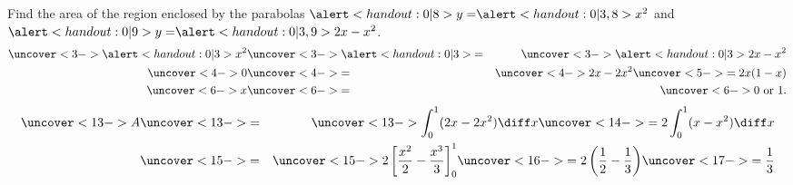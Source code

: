 \begin{frame}
\begin{example}[Example 2, p. 348]
\begin{columns}
Find the area of the region enclosed by the parabolas $\alert<handout:0| 8>{y =} \alert<handout:0| 3,8>{x^2}$ and $\alert<handout:0| 9>{y =} \alert<handout:0| 3,9>{2x - x^2}$.
\begin{eqnarray*}
\uncover<3->{\alert<handout:0| 3>{x^2}} & \uncover<3->{\alert<handout:0| 3>{=}} & \uncover<3->{\alert<handout:0| 3>{2x - x^2}} \\
\uncover<4->{0} & \uncover<4->{=} & \uncover<4->{2x - 2x^2} \uncover<5->{ = 2x(1 - x)} \\
\uncover<6->{x} & \uncover<6->{=} & \uncover<6->{0 \textrm{ or } 1.}
\end{eqnarray*}
\begin{eqnarray*}
\uncover<13->{A} & \uncover<13->{=} & \uncover<13->{\int_0^1 (2x - 2x^2) \diff x} \uncover<14->{ = 2\int_0^1 (x - x^2) \diff x} \\
 & \uncover<15->{=} & \uncover<15->{2\left[ \frac{x^2}{2} - \frac{x^3}{3}\right]_0^1} \uncover<16->{ = 2\left( \frac{1}{2} - \frac{1}{3}\right)} \uncover<17->{ = \frac{1}{3}}
\end{eqnarray*}
\end{columns}
\end{example}
\end{frame}

